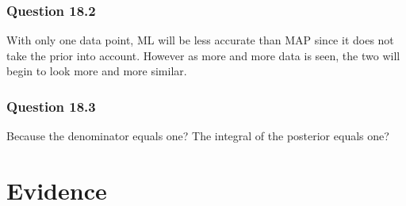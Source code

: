 \documentclass[10pt, a4paper, twocolumn]{article} %
\begin{document}
\subsubsection*{Question 18.2}

With only one data point, ML will be less accurate than MAP since it does not take the prior into account. However as more and more data is seen, the two will begin to look more and more similar.

\subsubsection*{Question 18.3}

Because the denominator equals one? The integral of the posterior equals one?

\section{Evidence}


\printbibliography[title={Bibliography}] %

\end{document}
